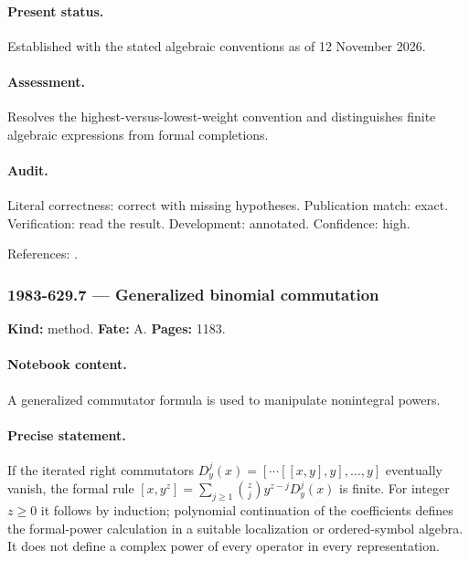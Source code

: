 \paragraph{Present status.} Established with the stated algebraic conventions as of 12 November 2026.

\paragraph{Assessment.} Resolves the highest-versus-lowest-weight convention and distinguishes finite algebraic expressions from formal completions.

\paragraph{Audit.} Literal correctness: correct with missing hypotheses. Publication match: exact. Verification: read the result. Development: annotated. Confidence: high.

\noindent References: \citep{malikovfeiginfuchs1986singular}.\par

\subsubsection{1983-629.7 --- Generalized binomial commutation}

\label{item:1983-629.7}

\noindent\textbf{Kind:} method. \textbf{Fate:} A. \textbf{Pages:} 1183.\par

\paragraph{Notebook content.} A generalized commutator formula is used to manipulate nonintegral powers.

\paragraph{Precise statement.} If the iterated right commutators \(D_y^j(x)=[\cdots[[x,y],y],\ldots,y]\) eventually vanish, the formal rule \([x,y^z]=\sum_{j\ge1}\binom zj y^{z-j}D_y^j(x)\) is finite. For integer \(z\ge0\) it follows by induction; polynomial continuation of the coefficients defines the formal-power calculation in a suitable localization or ordered-symbol algebra. It does not define a complex power of every operator in every representation.

